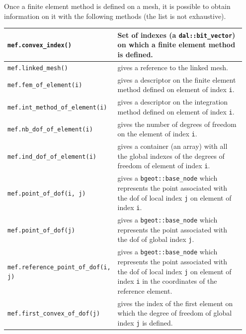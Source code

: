 \documentclass[11pt,a4paper]{article}
\begin{document}
Once a finite element method is defined on a mesh, it is possible to obtain information on it with the following methods (the list is not exhaustive).\\[0.5cm]
\begin{center} \begin{tabular}{|m{0.4\linewidth}|m{0.55\linewidth}|} \hline

  {\tt mef.convex\_index()} & Set of indexes (a {\tt dal::bit\_vector}) on which a finite element method is defined.  \\ \hline

  {\tt mef.linked\_mesh()} & gives a reference to the linked mesh.  \\ \hline

  {\tt mef.fem\_of\_element(i)} & gives a descriptor on the finite element method defined on element of index {\tt i}.  \\ \hline

  {\tt mef.int\_method\_of\_element(i)} & gives a descriptor on the integration method defined on element of index {\tt i}.  \\ \hline

  {\tt mef.nb\_dof\_of\_element(i)} & gives the number of degrees of freedom on the element of index {\tt i}.  \\ \hline

  {\tt mef.ind\_dof\_of\_element(i)} & gives a container (an array) with all the global indexes of the degrees of freedom of element of index {\tt i}.  \\ \hline

  {\tt mef.point\_of\_dof(i, j)} & gives a {\tt bgeot::base\_node} which represents the point associated with the dof of local index {\tt j} on element of index {\tt i}.  \\ \hline

  {\tt mef.point\_of\_dof(j)} & gives a {\tt bgeot::base\_node} which represents the point associated with the dof of global index {\tt j}.  \\ \hline

  {\tt mef.reference\_point\_of\_dof(i, j)} & gives a {\tt bgeot::base\_node} which represents the point associated with the dof of local index {\tt j} on element of index {\tt i} in the coordinates of the reference element.  \\ \hline

  {\tt mef.first\_convex\_of\_dof(j)} & gives the index of the first element on which the degree of freedom of global index {\tt j} is defined.  \\ \hline
  

\end{tabular}
\end{center}
\end{document}
